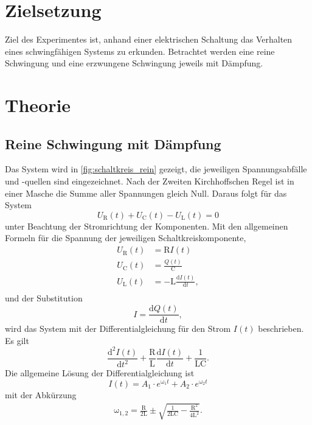 \section{Zielsetzung}
Ziel des Experimentes ist, anhand einer elektrischen Schaltung das Verhalten eines schwingfähigen Systems zu erkunden. 
Betrachtet werden eine reine Schwingung und eine erzwungene Schwingung jeweils mit Dämpfung.

\section{Theorie}
\label{sec:Theorie}
\subsection{Reine Schwingung mit Dämpfung}
Das System wird in \ref{fig:schaltkreis_rein} gezeigt, die jeweiligen Spannungsabfälle und -quellen sind eingezeichnet.
Nach der Zweiten Kirchhoffschen Regel ist in einer Masche die Summe aller Spannungen gleich Null. 
Daraus folgt für das System
\begin{equation}
	U_\text{R}(t)+U_\text{C}(t)-U_\text{L}(t)=0
\end{equation}
unter Beachtung der Stromrichtung der Komponenten.
Mit den allgemeinen Formeln für die Spannung der jeweiligen Schaltkreiskomponente,
\begin{align}
	U_\text{R}(t) &= \text{R} I(t)\\
	U_\text{C}(t) &= \frac{Q(t)}{\text{C}} \\
	U_\text{L}(t) &= -\text{L}\frac{\mathup{d}I(t)}{\mathup{d}t},\\
\end{align}
und der Substitution
\begin{equation}
	I=\frac{\mathup{d}Q(t)}{\mathup{d}t},
\end{equation}
wird das System mit der Differentialgleichung für den Strom $I(t)$ beschrieben.
Es gilt
\begin{equation}
	\frac{\mathup{d^2}I(t)}{\mathup{d}t^2}+\frac{\mathup{R}}{\mathup{L}}\frac{\mathup{d}I(t)}{\mathup{d}t}+\frac{1}{\mathup{LC}}.
\end{equation}
Die allgemeine Lösung der Differentialgleichung ist
\begin{equation}
	I(t) = A_1\cdot e^{\mathup{\omega_1}t} +A_2\cdot e^{\mathup{\omega_2}t}
	\label{eq:allgloesung}
\end{equation}
mit der Abkürzung
\begin{align}
	\mathup{\omega_{1,2}}= \frac{\mathup{R}}{2\mathup{L}}\pm\sqrt{\frac{1}{2\mathup{LC}}-\frac{\mathup{R^2}}{4\mathup{L^2}}}.
\end{align}
